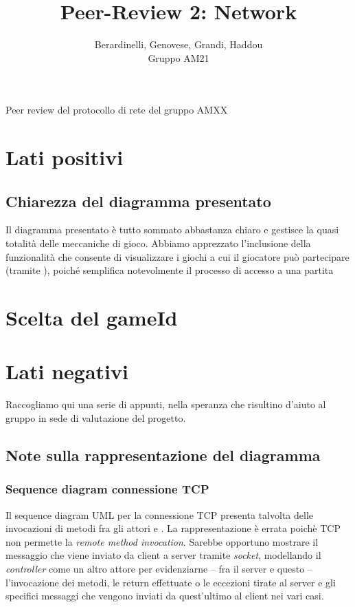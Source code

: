 \documentclass[12pt]{article}
\title{Peer-Review 2: Network}
\author{Berardinelli, Genovese, Grandi, Haddou\\Gruppo AM21}
\newcommand*\ttvar[1]{\texttt{\expandafter\dottvar\detokenize{#1}\relax}}
\newcommand*\dottvar[1]{\ifx\relax#1\else
  \expandafter\ifx\string.#1\string.\allowbreak\else#1\fi
  \expandafter\dottvar\fi}
\begin{document}
\maketitle
\begin{center}
Peer review del protocollo di rete del gruppo AMXX 
\end{center}

\tableofcontents
\newpage

\section{Lati positivi}
\subsection{Chiarezza del diagramma presentato}
Il diagramma presentato è tutto sommato abbastanza chiaro e gestisce la quasi totalità delle meccaniche di gioco. 
Abbiamo apprezzato l'inclusione della funzionalità che consente di visualizzare i giochi a cui il giocatore può partecipare (tramite \ttvar{getGameIds()}), poiché semplifica notevolmente il processo di accesso a una partita
\section{Scelta del gameId}

\section{Lati negativi}
Raccogliamo qui una serie di appunti, nella speranza che risultino d'aiuto al gruppo in sede di valutazione del progetto.  

\subsection{Note sulla rappresentazione del diagramma}
 \subsubsection{Sequence diagram connessione TCP}
 Il sequence diagram UML per la connessione TCP presenta talvolta delle invocazioni di metodi fra gli attori \ttvar{Client} e \ttvar{Server}. La rappresentazione è errata poichè TCP non permette la \textit{remote method invocation}. Sarebbe opportuno mostrare il messaggio che viene inviato da client a server tramite \textit{socket}, modellando il \textit{controller} come un altro attore per evidenziarne -- fra il server e questo -- l'invocazione dei metodi, le return effettuate o le eccezioni tirate al server e gli specifici messaggi che vengono inviati da quest'ultimo al client nei vari casi.
\end{document}
